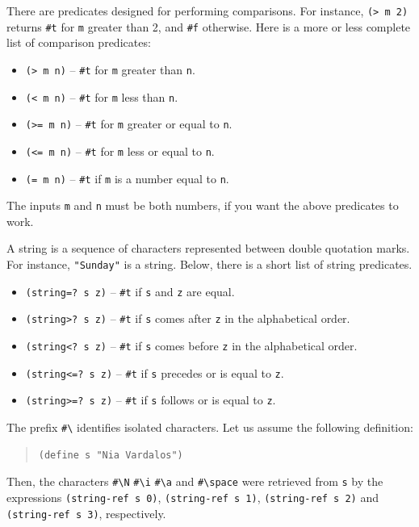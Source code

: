 \documentclass[a4paper,12pt]{book}
\begin{document}
There are predicates designed for
performing comparisons. For instance,
\verb|(> m 2)| returns \verb|#t| for
\verb|m| greater than 2, and \verb|#f|
otherwise. Here is a more or less complete
list of comparison predicates:
\begin{itemize}
\item\verb|(> m n)| -- \verb|#t| for
\verb|m| greater than \verb|n|.
\item\verb|(< m n)| -- \verb|#t| for
\verb|m| less than \verb|n|.
\item\verb|(>= m n)| -- \verb|#t| for
\verb|m| greater or equal to \verb|n|.
\item\verb|(<= m n)| -- \verb|#t| for
\verb|m| less or equal to \verb|n|.
\item\verb|(= m n)| -- \verb|#t| if
\verb|m| is a number equal to \verb|n|.
\end{itemize}
The inputs \verb|m| and \verb|n| must
be both numbers, if you want
the above predicates to work.


A string is a sequence of characters
represented between double quotation
marks. For instance, \verb|"Sunday"|
is a string. Below, there is a short
list of string predicates.
\begin{itemize}
\item\verb|(string=? s z)| -- \verb|#t|
if \verb|s| and \verb|z| are equal.
\item\verb|(string>? s z)| -- \verb|#t|
if \verb|s|  comes
after \verb|z| in the alphabetical order.
\item\verb|(string<? s z)| -- \verb|#t|
if \verb|s| comes before \verb|z|
in the alphabetical order.
\item\verb|(string<=? s z)| -- \verb|#t| if
\verb|s| precedes or is equal to \verb|z|.
\item\verb|(string>=? s z)| -- \verb|#t| if
\verb|s| follows or is equal to \verb|z|.
\end{itemize}

The prefix \verb|#\| identifies isolated
characters. Let us assume the following
definition:
\begin{quote}
\begin{verbatim}
(define s "Nia Vardalos")
\end{verbatim}
\end{quote}
Then, the characters
\verb|#\N| \verb|#\i| 
\verb|#\a| and \verb|#\space|
were retrieved from
\verb|s| by the
expressions \verb|(string-ref s 0)|,
\verb|(string-ref s 1)|,
\verb|(string-ref s 2)| and
\verb|(string-ref s 3)|,
\verb|| respectively.
\end{document}
